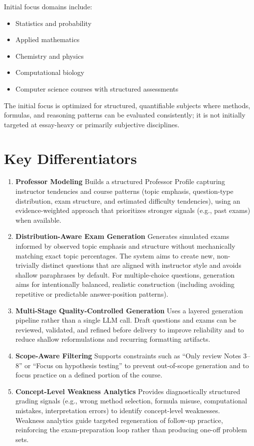 \documentclass[11pt]{article}
\begin{document}
Initial focus domains include:
\begin{itemize}
\item Statistics and probability
\item Applied mathematics
\item Chemistry and physics
\item Computational biology
\item Computer science courses with structured assessments
\end{itemize}

The initial focus is optimized for structured, quantifiable subjects where methods, formulas, and reasoning patterns can be evaluated consistently; it is not initially targeted at essay-heavy or primarily subjective disciplines.

\section{Key Differentiators}
\begin{enumerate}
\item \textbf{Professor Modeling}
Builds a structured Professor Profile capturing instructor tendencies and course patterns (topic emphasis, question-type distribution, exam structure, and estimated difficulty tendencies), using an evidence-weighted approach that prioritizes stronger signals (e.g., past exams) when available.

\item \textbf{Distribution-Aware Exam Generation}
Generates simulated exams informed by observed topic emphasis and structure without mechanically matching exact topic percentages. The system aims to create new, non-trivially distinct questions that are aligned with instructor style and avoids shallow paraphrases by default. For multiple-choice questions, generation aims for intentionally balanced, realistic construction (including avoiding repetitive or predictable answer-position patterns).

\item \textbf{Multi-Stage Quality-Controlled Generation}
Uses a layered generation pipeline rather than a single LLM call. Draft questions and exams can be reviewed, validated, and refined before delivery to improve reliability and to reduce shallow reformulations and recurring formatting artifacts.

\item \textbf{Scope-Aware Filtering}
Supports constraints such as ``Only review Notes 3--8'' or ``Focus on hypothesis testing'' to prevent out-of-scope generation and to focus practice on a defined portion of the course.

\item \textbf{Concept-Level Weakness Analytics}
Provides diagnostically structured grading signals (e.g., wrong method selection, formula misuse, computational mistakes, interpretation errors) to identify concept-level weaknesses. Weakness analytics guide targeted regeneration of follow-up practice, reinforcing the exam-preparation loop rather than producing one-off problem sets.
\end{enumerate}
\end{document}
